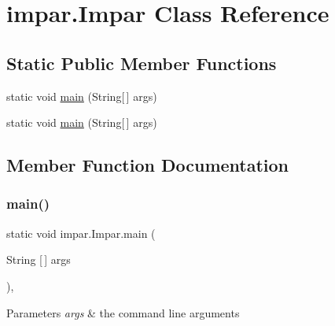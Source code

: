 \hypertarget{classimpar_1_1_impar}{}\section{impar.\+Impar Class Reference}
\label{classimpar_1_1_impar}
\subsection*{Static Public Member Functions}
\begin{DoxyCompactItemize}
\item 
static void \mbox{\hyperlink{classimpar_1_1_impar_adba5ae39ea2ae0f46838cc0a03bbab14}{main}} (String\mbox{[}$\,$\mbox{]} args)
\item 
static void \mbox{\hyperlink{classimpar_1_1_impar_adba5ae39ea2ae0f46838cc0a03bbab14}{main}} (String\mbox{[}$\,$\mbox{]} args)
\end{DoxyCompactItemize}


\subsection{Member Function Documentation}
\mbox{\label{classimpar_1_1_impar_adba5ae39ea2ae0f46838cc0a03bbab14}} 
\subsubsection{\texorpdfstring{main()}{main()}\hspace{0.1cm}{\footnotesize\ttfamily [1/2]}}
{\footnotesize\ttfamily static void impar.\+Impar.\+main (\begin{DoxyParamCaption}\item[{String \mbox{[}$\,$\mbox{]}}]{args }\end{DoxyParamCaption})\hspace{0.3cm}{\ttfamily [inline]}, {\ttfamily [static]}}


\begin{DoxyParams}{Parameters}
{\em args} & the command line arguments \\
\hline
\end{DoxyParams}

